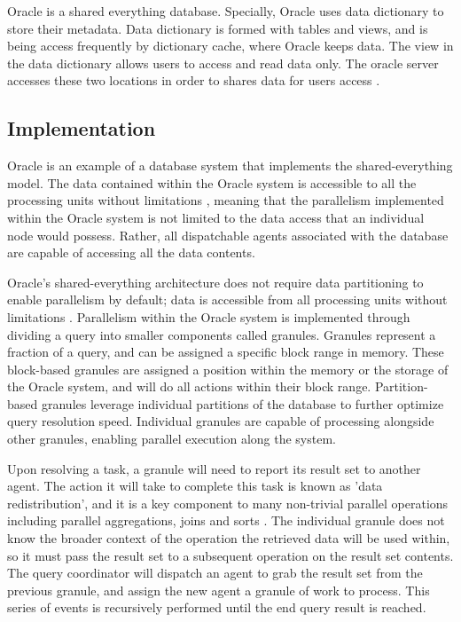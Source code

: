 \documentclass[onecolumn, draftclsnofoot,10pt, compsoc]{IEEEtran}
\begin{document}
  Oracle is a shared everything database.
  Specially, Oracle uses data dictionary to store their metadata. 
  Data dictionary is formed with tables and views, and is being access frequently by dictionary cache, where Oracle keeps data. 
  The view in the data dictionary allows users to access and read data only.
  The oracle server accesses these two locations in order to shares data for users access \cite{OracleDataDictionary}.

    \subsection{Implementation}
Oracle is an example of a database system that implements the shared-everything model.
The data contained within the Oracle system is accessible to all the processing units without limitations \cite{OraclePEwODF}, meaning that the parallelism implemented within the Oracle system is not limited to the data access that an individual node would possess.
Rather, all dispatchable agents associated with the database are capable of accessing all the data contents.

Oracle’s shared-everything architecture does not require data partitioning to enable parallelism by default; data is accessible from all processing units without limitations \cite{OraclePEwODF}. 
Parallelism within the Oracle system is implemented through dividing a query into smaller components called granules.
Granules represent a fraction of a query, and can be assigned a specific block range in memory.
These block-based granules are assigned a position within the memory or the storage of the Oracle system, and will do all actions within their block range.
Partition-based granules leverage individual partitions of the database to further optimize query resolution speed.
Individual granules are capable of processing alongside other granules, enabling parallel execution along the system. 
\graphicspath{ {./ } }

Upon resolving a task, a granule will need to report its result set to another agent. 
The action it will take to complete this task is known as 'data redistribution', and it is a key component to many non-trivial parallel operations including parallel aggregations, joins and sorts \cite{OraclePEwODF}.
The individual granule does not know the broader context of the operation the retrieved data will be used within, so it must pass the result set to a subsequent operation on the result set contents.
The query coordinator will dispatch an agent to grab the result set from the previous granule, and assign the new agent a granule of work to process.
This series of events is recursively performed until the end query result is reached.
\end{document}
